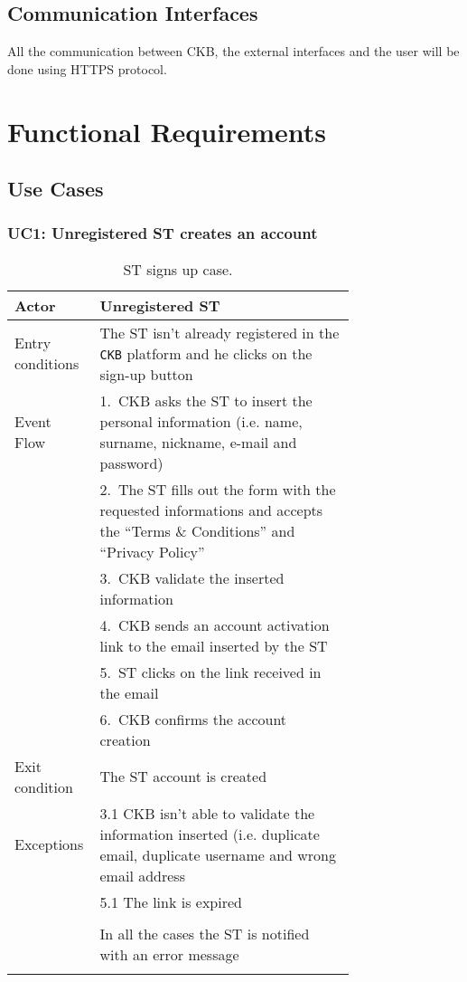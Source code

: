 \subsection{Communication Interfaces}
\label{ss:Communication_interfaces}%

All the communication between CKB, the external interfaces and the user will be done using HTTPS protocol.

\section{Functional Requirements}
\label{s:Functional_requirements}%

\subsection{Use Cases}
\label{ss:Use_cases}%

\subsubsection*{UC1: Unregistered ST creates an account}
\begin{center}
  \begin{longtable}{l|p{0.75\linewidth}}
    \hline
    Actor & Unregistered ST \\
    \hline
    Entry conditions & The ST isn’t already registered in the \verb|CKB| platform and he clicks on the sign-up button \\
    \hline
    Event Flow & 1.\ CKB asks the ST to insert the personal information (i.e. name, surname, nickname, e-mail and password) \\
    & 2.\ The ST fills out the form with the requested informations and accepts the “Terms \& Conditions” and “Privacy Policy” \\
    & 3.\ CKB validate the inserted information \\
    & 4.\ CKB sends an account activation link to the email inserted by the ST \\
    & 5.\ ST clicks on the link received in the email \\
    & 6.\ CKB confirms the account creation  \\
    \hline
    Exit condition & The ST account is created \\
    \hline
    Exceptions & 3.1 CKB isn’t able to validate the information inserted (i.e. duplicate email, duplicate username and wrong email address \\
    & 5.1 The link is expired \\ \\
    & In all the cases the ST is notified with an error message\\
    \hline
    \caption{ST signs up case.}
    \label{tab: ST_signs_up}
  \end{longtable}
\end{center}

